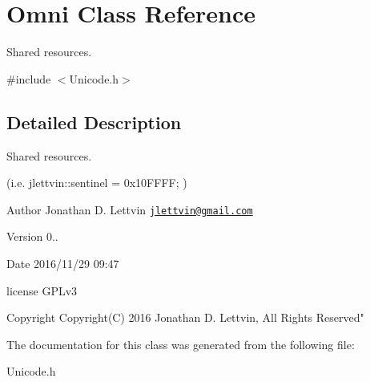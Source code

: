 \hypertarget{class_omni}{}\section{Omni Class Reference}
\label{class_omni}


Shared resources.  




{\ttfamily \#include $<$Unicode.\+h$>$}



\subsection{Detailed Description}
Shared resources. 

(i.\+e. jlettvin\+::sentinel = 0x10\+F\+F\+F\+F; )

\begin{DoxyAuthor}{Author}
Jonathan D. Lettvin \href{mailto:jlettvin@gmail.com}{\tt jlettvin@gmail.\+com}
\end{DoxyAuthor}
\begin{DoxyVersion}{Version}
0..
\end{DoxyVersion}
\begin{DoxyDate}{Date}
2016/11/29 09\+:47
\end{DoxyDate}
license G\+P\+Lv3

\begin{DoxyCopyright}{Copyright}
Copyright(\+C) 2016 Jonathan D. Lettvin, All Rights Reserved" 
\end{DoxyCopyright}


The documentation for this class was generated from the following file\+:\begin{DoxyCompactItemize}
\item 
Unicode.\+h\end{DoxyCompactItemize}

